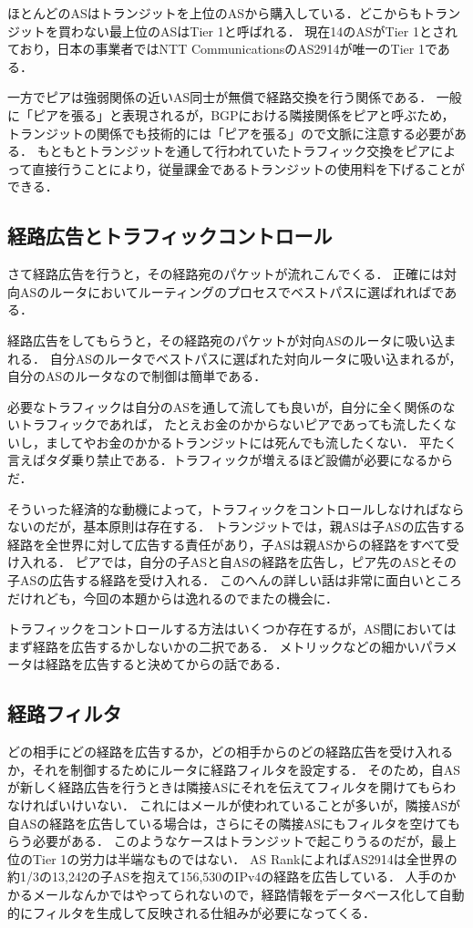 ほとんどのASはトランジットを上位のASから購入している．どこからもトランジットを買わない最上位のASはTier 1と呼ばれる．
現在14のASがTier 1とされており，日本の事業者ではNTT CommunicationsのAS2914が唯一のTier 1である．

一方でピアは強弱関係の近いAS同士が無償で経路交換を行う関係である．
一般に「ピアを張る」と表現されるが，BGPにおける隣接関係をピアと呼ぶため，トランジットの関係でも技術的には「ピアを張る」ので文脈に注意する必要がある．
もともとトランジットを通して行われていたトラフィック交換をピアによって直接行うことにより，従量課金であるトランジットの使用料を下げることができる．

\subsection{経路広告とトラフィックコントロール}

さて経路広告を行うと，その経路宛のパケットが流れこんでくる．
正確には対向ASのルータにおいてルーティングのプロセスでベストパスに選ばれればである．

経路広告をしてもらうと，その経路宛のパケットが対向ASのルータに吸い込まれる．
自分ASのルータでベストパスに選ばれた対向ルータに吸い込まれるが，自分のASのルータなので制御は簡単である．

必要なトラフィックは自分のASを通して流しても良いが，自分に全く関係のないトラフィックであれば，
たとえお金のかからないピアであっても流したくないし，ましてやお金のかかるトランジットには死んでも流したくない．
平たく言えばタダ乗り禁止である．トラフィックが増えるほど設備が必要になるからだ．

そういった経済的な動機によって，トラフィックをコントロールしなければならないのだが，基本原則は存在する．
トランジットでは，親ASは子ASの広告する経路を全世界に対して広告する責任があり，子ASは親ASからの経路をすべて受け入れる．
ピアでは，自分の子ASと自ASの経路を広告し，ピア先のASとその子ASの広告する経路を受け入れる．
このへんの詳しい話は非常に面白いところだけれども，今回の本題からは逸れるのでまたの機会に．

トラフィックをコントロールする方法はいくつか存在するが，AS間においてはまず経路を広告するかしないかの二択である．
メトリックなどの細かいパラメータは経路を広告すると決めてからの話である．

\subsection{経路フィルタ}

どの相手にどの経路を広告するか，どの相手からのどの経路広告を受け入れるか，それを制御するためにルータに経路フィルタを設定する．
そのため，自ASが新しく経路広告を行うときは隣接ASにそれを伝えてフィルタを開けてもらわなければいけいない．
これにはメールが使われていることが多いが，隣接ASが自ASの経路を広告している場合は，さらにその隣接ASにもフィルタを空けてもらう必要がある．
このようなケースはトランジットで起こりうるのだが，最上位のTier 1の労力は半端なものではない．
AS RankによればAS2914は全世界の約1/3の13,242の子ASを抱えて156,530のIPv4の経路を広告している．
人手のかかるメールなんかではやってられないので，経路情報をデータベース化して自動的にフィルタを生成して反映される仕組みが必要になってくる．

